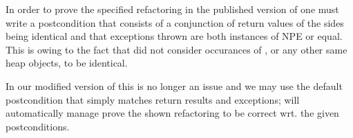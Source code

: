 In order to prove the specified  refactoring in the published version of \Refinity{} one must write a postcondition that consists of a conjunction of return values of the sides being identical and
that exceptions thrown are both instances of NPE or equal.
This is owing to the fact that \Refinity{} did not consider occurances of , or any other same heap objects, to be identical.

In our modified version of \Refinity{} this is no longer an issue and we may use the default postcondition that simply matches return results and exceptions;
\Refinity{} will automatically manage prove the shown  refactoring to be correct wrt. the given postconditions.


